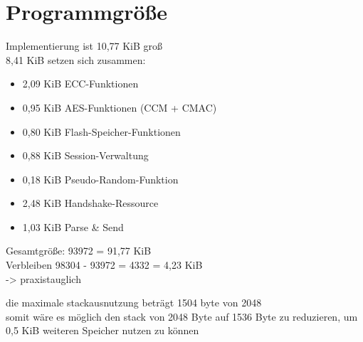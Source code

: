 \section{Programmgröße}

Implementierung ist 10,77 KiB groß\\
8,41 KiB setzen sich zusammen:
\begin{itemize}
  \item 2,09 KiB ECC-Funktionen
  \item 0,95 KiB AES-Funktionen (CCM + CMAC)
  \item 0,80 KiB Flash-Speicher-Funktionen
  \item 0,88 KiB Session-Verwaltung
  \item 0,18 KiB Pseudo-Random-Funktion
  \item 2,48 KiB Handshake-Ressource
  \item 1,03 KiB Parse \& Send
\end{itemize}

Gesamtgröße: 93972 = 91,77 KiB\\
Verbleiben   98304 - 93972 = 4332 = 4,23 KiB\\
-> praxistauglich

die maximale stackausnutzung beträgt 1504 byte von 2048\\
somit wäre es möglich den stack von 2048 Byte auf 1536 Byte zu reduzieren, um 0,5 KiB weiteren Speicher nutzen zu können